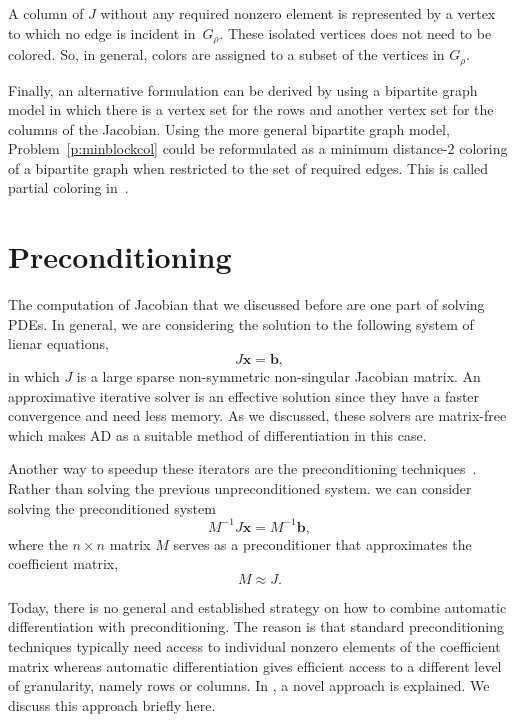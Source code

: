 \documentclass[12pt, oneside]{book}
\newcommand{\vek}[1]{{\ensuremath{\mathbf #1}}}
\newcommand{\sparsifysymbol}{\ensuremath{\rho}}
\begin{document}
A column of $J$ without any required nonzero element is represented by a vertex to which
no edge is incident in~$G_\sparsifysymbol$. These isolated vertices does not need to be
colored. So, in general, colors are assigned to a subset of the vertices in
$G_\sparsifysymbol$.

Finally, an alternative formulation can be derived by using a bipartite graph model in
which there is a vertex set for the rows and another vertex set for the columns of the
Jacobian. Using the more general bipartite graph model, Problem~\ref{p:minblockcol} could
be reformulated as a minimum distance-2 coloring of a bipartite graph when restricted to
the set of required edges. This is called partial coloring in~\cite{Gebremedhin05whatcolor}.

\section{Preconditioning}
The computation of Jacobian that we discussed before are one part of solving PDEs. 
In general, we are considering the solution to the following system of lienar equations,
$$
J\vek{x} = \vek{b},
$$
in which $J$ is a large sparse non-symmetric non-singular Jacobian matrix. An approximative iterative solver is an
effective solution since they have a faster convergence and need less memory. As we discussed,
these solvers are matrix-free which makes AD as a suitable method of differentiation in this case.

Another way to speedup these iterators are 
the preconditioning techniques~\cite{precond1,precond2}.
Rather than solving the previous unpreconditioned system. 
we can consider solving the preconditioned system
\begin{equation}
\label{e:precond}
M^{-1} J \vek{x}= M^{-1}\vek{b},
\end{equation}
where the $n \times n$ matrix $M$ serves as a preconditioner that approximates
the coefficient matrix,
$$
M \approx J.
$$

Today, there is no general and established
strategy on how to combine automatic differentiation with preconditioning. The reason is
that standard preconditioning techniques typically need access to individual nonzero
elements of the coefficient matrix whereas automatic differentiation gives efficient
access to a different level of granularity, namely rows or columns.
In \cite{Lulfesmann2012Fap}, a novel approach is explained.
We discuss this approach briefly here.
\end{document}
